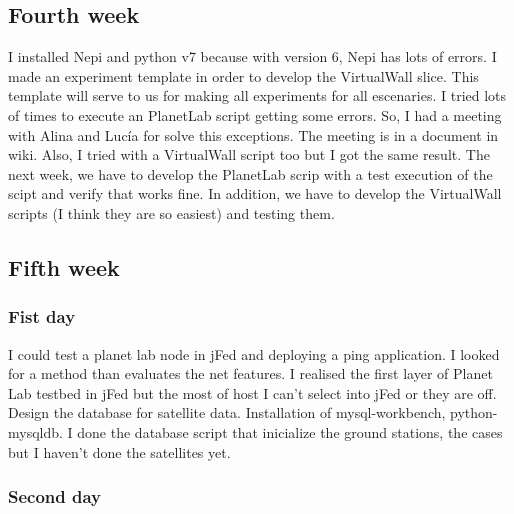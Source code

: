 \subsection{Fourth week}
I installed Nepi\cite{Nepi} and python v7 because with version 6, Nepi has lots of errors.
I made an experiment template in order to develop the VirtualWall slice. This template will serve to us for making all experiments for all escenaries.
I tried lots of times to execute an PlanetLab\cite{PLE} script getting some errors. So, I had a meeting with Alina and Lucía for solve this exceptions.
The meeting is in a document in wiki.
Also, I tried with a VirtualWall script too but I got the same result.
The next week, we have to develop the PlanetLab scrip with a test execution of the scipt and verify that works fine.
In addition, we have to develop the VirtualWall scripts (I think they are so easiest) and testing them.

\subsection{Fifth week}
\subsubsection{Fist day}

I could test a planet lab node in jFed and deploying a ping application.
I looked for a method than evaluates the net features.
I realised the first layer of Planet Lab testbed in jFed but the most of host I can't select into jFed or they are off.
Design the database for satellite data.
Installation of mysql-workbench, python-mysqldb.
I done the database script that inicialize the ground stations, the cases but I haven't done the satellites yet.


\subsubsection{Second day}
